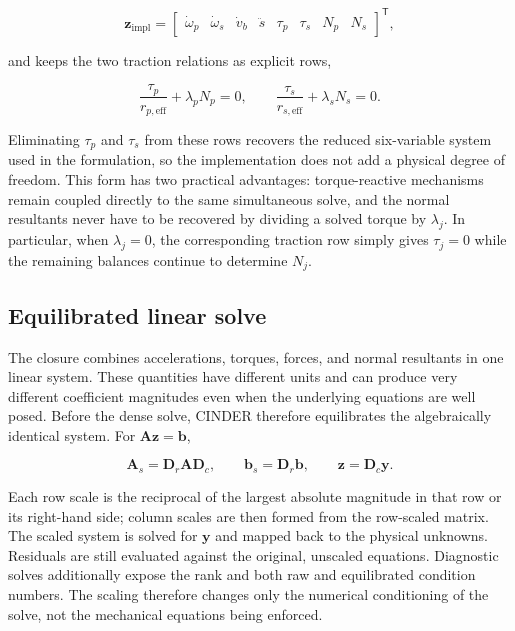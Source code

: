 \documentclass[11pt]{report}
\numberwithin{equation}{section}
\newcommand{\vect}[1]{\bm{#1}}
\begin{document}
\begin{equation}
    \vect{z}_{\mathrm{impl}}
    =
    \begin{bmatrix}
        \dot\omega_p & \dot\omega_s & \dot v_b & \ddot s &
        \tau_p & \tau_s & N_p & N_s
    \end{bmatrix}^{\mathsf T},
    \label{eq:appendix_eight_unknown_closure}
\end{equation}

and keeps the two traction relations as explicit rows,

\begin{equation}
    \frac{\tau_p}{r_{p,\mathrm{eff}}}+\lambda_pN_p=0,
    \qquad
    \frac{\tau_s}{r_{s,\mathrm{eff}}}+\lambda_sN_s=0.
    \label{eq:appendix_explicit_traction_rows}
\end{equation}

Eliminating $\tau_p$ and $\tau_s$ from these rows recovers the reduced
six-variable system used in the formulation, so the implementation does not
add a physical degree of freedom.  This form has two practical advantages: torque-reactive mechanisms remain
coupled directly to the same simultaneous solve, and the normal resultants
never have to be recovered by
dividing a solved torque by $\lambda_j$.  In particular, when
$\lambda_j=0$, the corresponding traction row simply gives $\tau_j=0$ while
the remaining balances continue to determine $N_j$.

\subsection{Equilibrated linear solve}
\label{app:num_equilibrated_solve}

The closure combines accelerations, torques, forces, and normal resultants in
one linear system.  These quantities have different units and can produce very
different coefficient magnitudes even when the underlying equations are well
posed.  Before the dense solve, CINDER therefore equilibrates the algebraically
identical system.  For $\vect{A}\vect{z}=\vect{b}$,

\begin{equation}
    \vect{A}_s=\vect{D}_r\vect{A}\vect{D}_c,
    \qquad
    \vect{b}_s=\vect{D}_r\vect{b},
    \qquad
    \vect{z}=\vect{D}_c\vect{y}.
    \label{eq:appendix_equilibrated_system}
\end{equation}

Each row scale is the reciprocal of the largest absolute magnitude in that row
or its right-hand side; column scales are then formed from the row-scaled
matrix.  The scaled system is solved for $\vect{y}$ and mapped back to the
physical unknowns.  Residuals are still evaluated against the original,
unscaled equations.  Diagnostic solves additionally expose the rank
and both raw and equilibrated condition numbers.  The scaling therefore changes
only the numerical conditioning of the solve, not the mechanical equations
being enforced.
\end{document}
